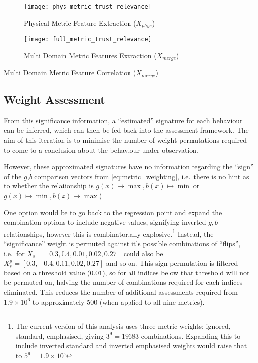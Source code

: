 \begin{figure}[h!]
  \centering
  \texttt{[image: phys\_metric\_trust\_relevance]}
  \caption{Physical Metric Feature Extraction ($X_{phys}$)}
  \label{fig:phys_feature_extraction}
\end{figure}

\begin{figure}[h!]
  \centering
  \texttt{[image: full\_metric\_trust\_relevance]}
  \caption{Multi Domain  Metric Features Extraction ($X_{merge}$)}
  \label{fig:multi_feature_extraction}
\end{figure}

\begin{table}
  \centering
  \caption{Multi Domain Metric Feature Correlation ($X_{merge}$)}
  
  \label{tab:full_metric_correlations}
\end{table}



\subsection{Weight Assessment}\label{sec:weight_assessment}

From this significance information, a ``estimated'' signature for each behaviour can be inferred, which can then be fed back into the assessment framework. 
The aim of this iteration is to minimise the number of weight permutations required to come to a conclusion about the behaviour under observation. 

However, these approximated signatures have no information regarding the ``sign'' of the  $g$,$b$ comparison vectors from \eqref{eq:metric_weighting}, i.e.\ there is no hint as to whether the relationship is $g(x) \mapsto \max, b(x) \mapsto \min$ or $g(x) \mapsto \min, b(x) \mapsto \max$)  

One option would be to go back to the regression point and expand the combination options to include negative values, signifying inverted $g,b$ relationships, however this is combinatorially explosive.\footnote{The current version of this analysis uses three metric weights; ignored, standard, emphasised, giving $3^9 = 19683$ combinations. Expanding this to include inverted standard and inverted emphasised weights would raise that to $5^9 = 1.9\times 10^6$}
Instead, the ``significance'' weight is permuted against it's possible combinations of ``flips'', i.e.\ for $X_s=[0.3,0.4,0.01,0.02,0.27]$ could also be $X_s^p=[0.3,-0.4,0.01,0.02,0.27]$ and so on. 
This sign permutation is filtered based on a threshold value ($0.01$), so for all indices below that threshold will not be permuted on, halving the number of combinations required for each indices eliminated.
This reduces the number of additional assessments required from $1.9\times 10^6$ to approximately 500 (when applied to all nine metrics).

